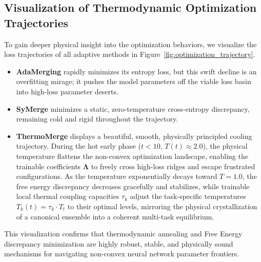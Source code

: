 \subsection{Visualization of Thermodynamic Optimization Trajectories}

To gain deeper physical insight into the optimization behaviors, we visualize the loss trajectories of all adaptive methods in Figure~\ref{fig:optimization_trajectory}.
\begin{itemize}
    \item \textbf{AdaMerging} rapidly minimizes its entropy loss, but this swift decline is an overfitting mirage; it pushes the model parameters off the viable loss basin into high-loss parameter deserts.
    \item \textbf{SyMerge} minimizes a static, zero-temperature cross-entropy discrepancy, remaining cold and rigid throughout the trajectory.
    \item \textbf{ThermoMerge} displays a beautiful, smooth, physically principled cooling trajectory. During the hot early phase ($t < 10$, $T(t) \approx 2.0$), the physical temperature flattens the non-convex optimization landscape, enabling the trainable coefficients $\boldsymbol{\Lambda}$ to freely cross high-loss ridges and escape frustrated configurations. As the temperature exponentially decays toward $T=1.0$, the free energy discrepancy decreases gracefully and stabilizes, while trainable local thermal coupling capacities $\tau_k$ adjust the task-specific temperatures $T_k(t) = \tau_k \cdot T_t$ to their optimal levels, mirroring the physical crystallization of a canonical ensemble into a coherent multi-task equilibrium.
\end{itemize}
This visualization confirms that thermodynamic annealing and Free Energy discrepancy minimization are highly robust, stable, and physically sound mechanisms for navigating non-convex neural network parameter frontiers.
